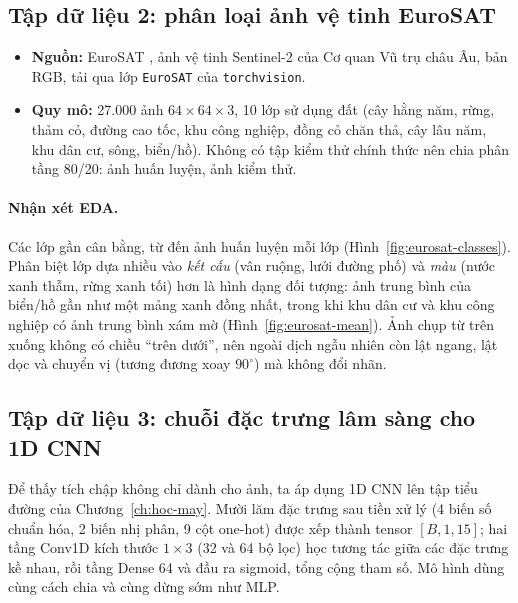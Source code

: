 \subsection{Tập dữ liệu 2: phân loại ảnh vệ tinh EuroSAT}

\begin{itemize}
  \item \textbf{Nguồn:} EuroSAT \cite{helber2019}, ảnh vệ tinh Sentinel-2 của Cơ quan Vũ trụ châu Âu, bản RGB, tải qua
    lớp \texttt{EuroSAT} của \texttt{torchvision}.
  \item \textbf{Quy mô:} 27.000 ảnh $64{\times}64{\times}3$, 10 lớp sử dụng đất (cây hằng năm, rừng, thảm cỏ, đường cao
    tốc, khu công nghiệp, đồng cỏ chăn thả, cây lâu năm, khu dân cư, sông, biển/hồ). Không có tập kiểm thử chính thức nên
    chia phân tầng 80/20:  ảnh huấn luyện,  ảnh kiểm thử.
\end{itemize}


\paragraph{Nhận xét EDA.} Các lớp gần cân bằng, từ  đến  ảnh
huấn luyện mỗi lớp (Hình~\ref{fig:eurosat-classes}). Phân biệt lớp dựa nhiều vào \emph{kết cấu} (vân ruộng, lưới đường phố)
và \emph{màu} (nước xanh thẫm, rừng xanh tối) hơn là hình dạng đối tượng: ảnh trung bình của biển/hồ gần như một mảng xanh
đồng nhất, trong khi khu dân cư và khu công nghiệp có ảnh trung bình xám mờ (Hình~\ref{fig:eurosat-mean}). Ảnh chụp từ trên
xuống không có chiều “trên dưới”, nên ngoài dịch ngẫu nhiên còn lật ngang, lật dọc và chuyển vị (tương đương xoay $90^\circ$)
mà không đổi nhãn.

\subsection{Tập dữ liệu 3: chuỗi đặc trưng lâm sàng cho 1D CNN}

Để thấy tích chập không chỉ dành cho ảnh, ta áp dụng 1D CNN lên tập tiểu đường của Chương~\ref{ch:hoc-may}. Mười lăm đặc
trưng sau tiền xử lý (4 biến số chuẩn hóa, 2 biến nhị phân, 9 cột one-hot) được xếp thành tensor $[B, 1, 15]$; hai tầng
Conv1D kích thước $1{\times}3$ (32 và 64 bộ lọc) học tương tác giữa các đặc trưng kề nhau, rồi tầng Dense 64 và đầu ra
sigmoid, tổng cộng  tham số. Mô hình dùng cùng cách chia và cùng dừng sớm như MLP.

